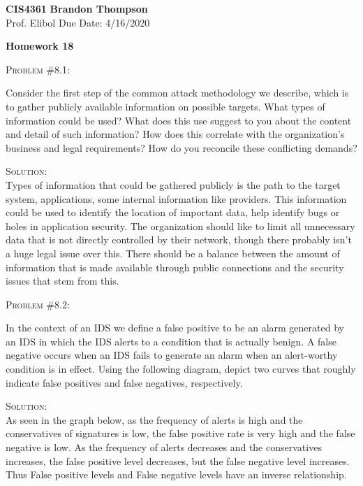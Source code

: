 \documentclass[12pt]{article}
\newenvironment{problem}[1]
{\begin{mdframed}[linewidth=0.8pt]
        \textsc{Problem #1:}

}
    {\end{mdframed}}
\newenvironment{solution}
    {\textsc{Solution:}\\}
    {\newpage}%
\begin{document}
\noindent
\textbf{CIS4361} \hfill \textbf{Brandon Thompson} \\
\normalsize Prof. Elibol \hfill Due Date: 4/16/2020 \\

\begin{center}
\textbf{Homework 18}
\end{center}
	\begin{problem}{\#8.1}
		Consider the first step of the common attack methodology we describe, which is to gather publicly available information on possible targets. What types of information could be used? What does this use suggest to you about the content and detail of such information? How does this correlate with the organization's business and legal requirements? How do you reconcile these conflicting demands?
	\end{problem}
	\begin{solution}
		Types of information that could be gathered publicly is the path to the target system, applications, some internal information like providers. This information could be used to identify the location of important data, help identify bugs or holes in application security. The organization should like to limit all unnecessary data that is not directly controlled by their network, though there probably isn't a huge legal issue over this. There should be a balance between the amount of information that is made available through public connections and the security issues that stem from this.
	\end{solution}

	\begin{problem}{\#8.2}
		In the context of an IDS we define a false positive to be an alarm generated by an IDS in which the IDS alerts to a condition that is actually benign. A false negative occurs when an IDS fails to generate an alarm when an alert-worthy condition is in effect. Using the following diagram, depict two curves that roughly indicate false positives and false negatives, respectively.
	\end{problem}
	\begin{solution}
		As seen in the graph below, as the frequency of alerts is high and the conservatives of signatures is low, the false positive rate is very high and the false negative is low. As the frequency of alerts decreases and the conservatives increases, the false positive level decreases, but the false negative level increases. Thus False positive levels and False negative levels have an inverse relationship.
	\end{solution}
\end{document}
